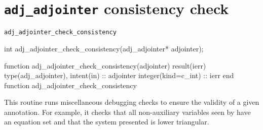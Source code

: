 \section{\texttt{adj_adjointer} consistency check}
\begin{boxwithtitle}{\texttt{adj_adjointer_check_consistency}}
\begin{minipage}{\columnwidth}
\begin{ccode}
  int adj_adjointer_check_consistency(adj_adjointer* adjointer);
\end{ccode}
\begin{fortrancode}
  function adj_adjointer_check_consistency(adjointer) result(ierr)
    type(adj_adjointer), intent(in) :: adjointer
    integer(kind=c_int) :: ierr
  end function adj_adjointer_check_consistency
\end{fortrancode}
\end{minipage}
\end{boxwithtitle}
This routine runs miscellaneous debugging checks to ensure the validity
of a given annotation. For example, it checks that all non-auxiliary
variables seen by \libadjoint have an equation set and that the system
presented is lower triangular.
